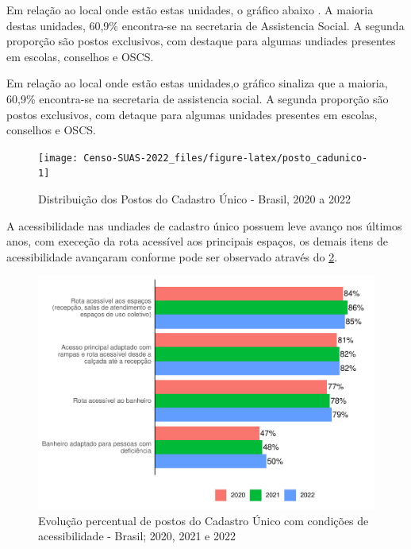 \documentclass[
  brazilian]{report}
\begin{document}
Em relação ao local onde estão estas unidades, o gráfico abaixo
. A maioria destas unidades, 60,9\% encontra-se
na secretaria de Assistencia Social. A segunda proporção são postos
exclusivos, com destaque para algumas undiades presentes em escolas,
conselhos e OSCS.

Em relação ao local onde estão estas unidades,o gráfico
 sinaliza que a maioria, 60,9\% encontra-se na
secretaria de assistencia social. A segunda proporção são postos
exclusivos, com detaque para algumas unidades presentes em escolas,
conselhos e OSCS.

\begin{figure}
\texttt{[image: Censo-SUAS-2022\_files/figure-latex/posto\_cadunico-1]} \caption[Distribuição dos Postos do Cadastro Único - Brasil, 2020 a 2022]{Distribuição dos Postos do Cadastro Único - Brasil, 2020 a 2022}\label{fig:posto_cadunico}
\end{figure}

A acessibilidade nas undiades de cadastro único possuem leve avanço nos
últimos anos, com execeção da rota acessível aos principais espaços, os
demais itens de acessibilidade avançaram conforme pode ser observado
através do \cref{fig:postcad-acessibilidade}.

\begin{figure}
\includegraphics{Censo-SUAS-2022_files/figure-latex/postcad-acessibilidade-1} \caption[Evolução percentual de postos do Cadastro Único com condições de acessibilidade - Brasil]{Evolução percentual de postos do Cadastro Único com condições de acessibilidade - Brasil; 2020, 2021 e 2022}\label{fig:postcad-acessibilidade}
\end{figure}
\end{document}
